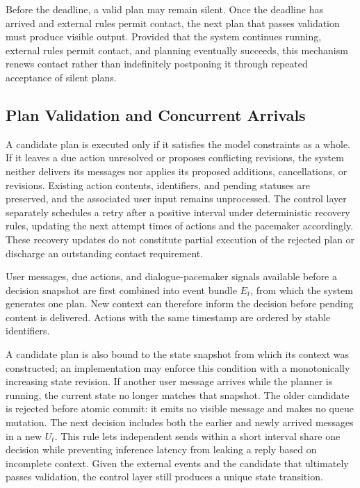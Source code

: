 \documentclass[manuscript,nonacm]{acmart}
\begin{document}
Before the deadline, a valid plan may remain silent. Once the deadline has
arrived and external rules permit contact, the next plan that passes validation
must produce visible output. Provided that the system continues running, external
rules permit contact, and planning eventually succeeds, this mechanism renews
contact rather than indefinitely postponing it through repeated acceptance of
silent plans.

\subsection{Plan Validation and Concurrent Arrivals}

A candidate plan is executed only if it satisfies the model constraints as a
whole. If it leaves a due action unresolved or proposes conflicting revisions,
the system neither delivers its messages nor applies its proposed additions,
cancellations, or revisions. Existing action contents, identifiers, and pending
statuses are preserved, and the associated user input remains unprocessed.
The control layer separately schedules a retry after a positive interval under
deterministic recovery rules, updating the next attempt times of actions and the
pacemaker accordingly. These recovery updates do not constitute partial execution
of the rejected plan or discharge an outstanding contact requirement.

User messages, due actions, and dialogue-pacemaker signals available before a
decision snapshot are first combined into event bundle $E_t$, from which the
system generates one plan. New context can therefore inform the decision before
pending content is delivered. Actions with the same timestamp are ordered by
stable identifiers.

A candidate plan is also bound to the state snapshot from which its context was
constructed; an implementation may enforce this condition with a monotonically
increasing state revision. If another user message arrives while the planner is
running, the current state no longer matches that snapshot. The older candidate
is rejected before atomic commit: it emits no visible message and makes no queue
mutation. The next decision includes both the earlier and newly arrived messages
in a new $U_t$. This rule lets independent sends within a short interval share
one decision while preventing inference latency from leaking a reply based on
incomplete context. Given the external events and the candidate that ultimately
passes validation, the control layer still produces a unique state transition.
\end{document}
